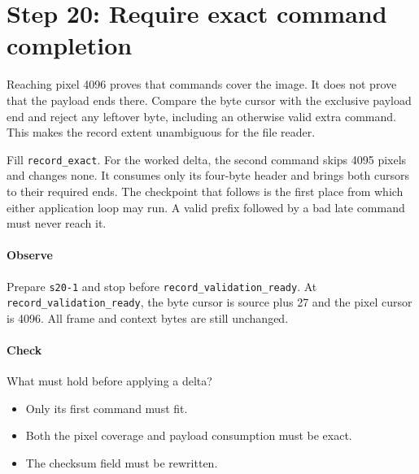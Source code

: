 \section{Step 20: Require exact command completion}
Reaching pixel 4096 proves that commands cover the image. It does not prove
that the payload ends there. Compare the byte cursor with the exclusive payload
end and reject any leftover byte, including an otherwise valid extra command.
This makes the record extent unambiguous for the file reader.

Fill \texttt{record\_exact}. For the worked delta, the second command skips
4095 pixels and changes none. It consumes only its four-byte header and brings
both cursors to their required ends. The checkpoint that follows is the first
place from which either application loop may run. A valid prefix followed by a
bad late command must never reach it.

\paragraph{Observe} Prepare \texttt{s20-1} and stop before
\texttt{record\_validation\_ready}. At \texttt{record\_validation\_ready}, the byte cursor is
source plus 27 and the pixel cursor is 4096. All frame and context bytes are
still unchanged.

\paragraph{Check} What must hold before applying a delta?
\begin{itemize}
\item[A.] Only its first command must fit.
\item[B.] Both the pixel coverage and payload consumption must be exact.
\item[C.] The checksum field must be rewritten.
\end{itemize}
